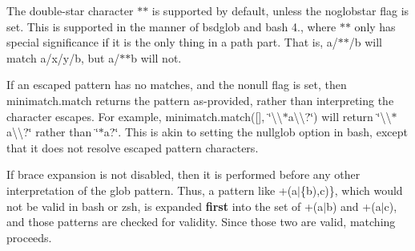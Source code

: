 The double-\/star character {\ttfamily $\ast$$\ast$} is supported by default, unless the {\ttfamily noglobstar} flag is set. This is supported in the manner of bsdglob and bash 4., where {\ttfamily $\ast$$\ast$} only has special significance if it is the only thing in a path part. That is, {\ttfamily a/$\ast$$\ast$/b} will match {\ttfamily a/x/y/b}, but {\ttfamily a/$\ast$$\ast$b} will not.

If an escaped pattern has no matches, and the {\ttfamily nonull} flag is set, then minimatch.\+match returns the pattern as-\/provided, rather than interpreting the character escapes. For example, {\ttfamily minimatch.\+match(\mbox{[}\mbox{]}, \char`\"{}\textbackslash{}\textbackslash{}$\ast$a\textbackslash{}\textbackslash{}?\char`\"{})} will return {\ttfamily \char`\"{}\textbackslash{}\textbackslash{}$\ast$a\textbackslash{}\textbackslash{}?\char`\"{}} rather than {\ttfamily \char`\"{}$\ast$a?\char`\"{}}. This is akin to setting the {\ttfamily nullglob} option in bash, except that it does not resolve escaped pattern characters.

If brace expansion is not disabled, then it is performed before any other interpretation of the glob pattern. Thus, a pattern like {\ttfamily +(a$\vert$\{b),c)\}}, which would not be valid in bash or zsh, is expanded {\bfseries first} into the set of {\ttfamily +(a$\vert$b)} and {\ttfamily +(a$\vert$c)}, and those patterns are checked for validity. Since those two are valid, matching proceeds. 